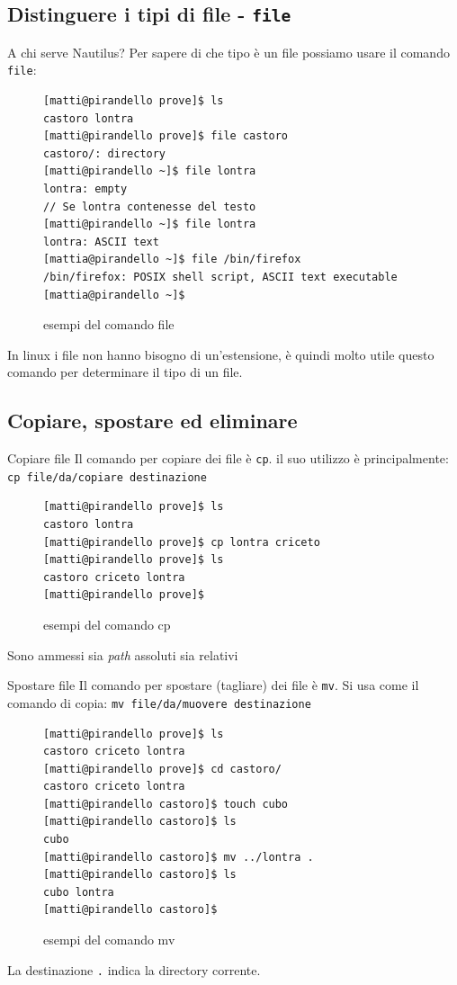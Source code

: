 \documentclass{beamer}
\begin{document}
  \subsection{Distinguere i tipi di file - \texttt{file}}
\begin{frame}[fragile]{A chi serve Nautilus?}
  Per sapere di che tipo è un file possiamo usare il comando \texttt{file}:
  \begin{figure}
    \begin{lstlisting}[basicstyle=\footnotesize]
[matti@pirandello prove]$ ls 
castoro lontra
[matti@pirandello prove]$ file castoro 
castoro/: directory
[matti@pirandello ~]$ file lontra
lontra: empty
// Se lontra contenesse del testo
[matti@pirandello ~]$ file lontra
lontra: ASCII text
[mattia@pirandello ~]$ file /bin/firefox
/bin/firefox: POSIX shell script, ASCII text executable
[mattia@pirandello ~]$
    \end{lstlisting}
    \caption{esempi del comando file}
  \end{figure}
  In linux i file non hanno bisogno di un'estensione, è quindi molto utile 
  questo comando per determinare il tipo di un file.
\end{frame}

\subsection{Copiare, spostare ed eliminare}
\begin{frame}[fragile]{Copiare file}
  Il comando per copiare dei file è \texttt{cp}. il suo utilizzo è 
  principalmente: \texttt{cp file/da/copiare destinazione}
  \begin{figure}
    \begin{lstlisting}[basicstyle=\small]
[matti@pirandello prove]$ ls 
castoro lontra
[matti@pirandello prove]$ cp lontra criceto 
[matti@pirandello prove]$ ls 
castoro criceto lontra
[matti@pirandello prove]$
    \end{lstlisting}
    \caption{esempi del comando cp}
  \end{figure}
  Sono ammessi sia \textit{path} assoluti sia relativi
\end{frame}

\begin{frame}[fragile]{Spostare file}
  Il comando per spostare (tagliare) dei file è \texttt{mv}. Si usa come il 
  comando di copia: \texttt{mv file/da/muovere 
  destinazione}
  \begin{figure}
    \begin{lstlisting}[basicstyle=\small]
[matti@pirandello prove]$ ls 
castoro criceto lontra
[matti@pirandello prove]$ cd castoro/ 
castoro criceto lontra
[matti@pirandello castoro]$ touch cubo
[matti@pirandello castoro]$ ls
cubo
[matti@pirandello castoro]$ mv ../lontra .
[matti@pirandello castoro]$ ls
cubo lontra
[matti@pirandello castoro]$
    \end{lstlisting}
    \caption{esempi del comando mv}
  \end{figure}
  La destinazione \texttt{.} indica la directory corrente.
\end{frame}
\end{document}
